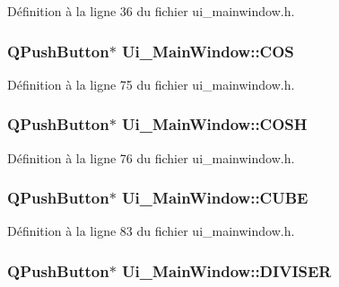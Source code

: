\-Définition à la ligne 36 du fichier ui\-\_\-mainwindow.\-h.

\hypertarget{class_ui___main_window_acba7c9022bfdd86ca0513771138d1f79}{
\subsubsection[{\-C\-O\-S}]{\setlength{\rightskip}{0pt plus 5cm}\-Q\-Push\-Button$\ast$ {\bf \-Ui\-\_\-\-Main\-Window\-::\-C\-O\-S}}}\label{class_ui___main_window_acba7c9022bfdd86ca0513771138d1f79}


\-Définition à la ligne 75 du fichier ui\-\_\-mainwindow.\-h.

\hypertarget{class_ui___main_window_ab6f966dfd75b5b8164555868f5331ada}{
\subsubsection[{\-C\-O\-S\-H}]{\setlength{\rightskip}{0pt plus 5cm}\-Q\-Push\-Button$\ast$ {\bf \-Ui\-\_\-\-Main\-Window\-::\-C\-O\-S\-H}}}\label{class_ui___main_window_ab6f966dfd75b5b8164555868f5331ada}


\-Définition à la ligne 76 du fichier ui\-\_\-mainwindow.\-h.

\hypertarget{class_ui___main_window_a6808a4c8810a4b54cdcfc0def3b69e4c}{
\subsubsection[{\-C\-U\-B\-E}]{\setlength{\rightskip}{0pt plus 5cm}\-Q\-Push\-Button$\ast$ {\bf \-Ui\-\_\-\-Main\-Window\-::\-C\-U\-B\-E}}}\label{class_ui___main_window_a6808a4c8810a4b54cdcfc0def3b69e4c}


\-Définition à la ligne 83 du fichier ui\-\_\-mainwindow.\-h.

\hypertarget{class_ui___main_window_aa03160fab513dd8c4942725310a79bbb}{
\subsubsection[{\-D\-I\-V\-I\-S\-E\-R}]{\setlength{\rightskip}{0pt plus 5cm}\-Q\-Push\-Button$\ast$ {\bf \-Ui\-\_\-\-Main\-Window\-::\-D\-I\-V\-I\-S\-E\-R}}}\label{class_ui___main_window_aa03160fab513dd8c4942725310a79bbb}


